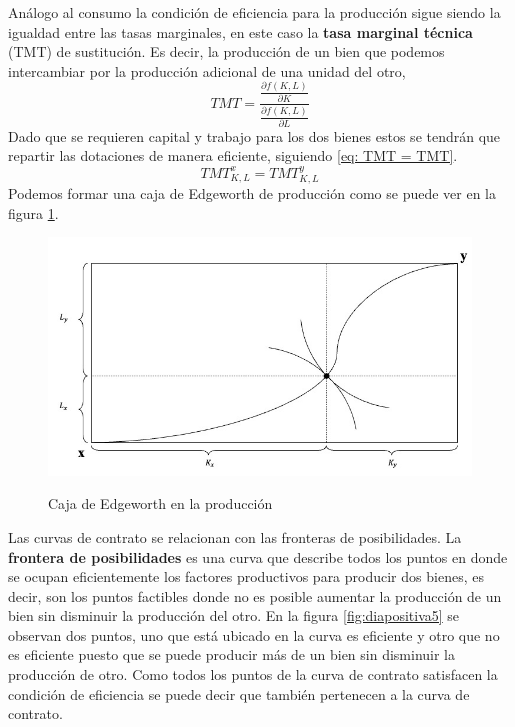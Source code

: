 Análogo al consumo la condición de eficiencia para la producción sigue siendo la igualdad entre las tasas marginales, en este caso la \textbf{tasa marginal técnica} (TMT) de sustitución. Es decir, la producción de un bien que podemos intercambiar por la producción adicional de una unidad del otro,
\begin{equation}
    TMT = \frac{ \frac{\partial f(K,L)}{\partial K} }{\frac{\partial f(K,L)}{\partial L} } \label{eq: TMT dfn}
\end{equation}
Dado que se requieren capital y trabajo para los dos bienes estos se tendrán que repartir las dotaciones de manera eficiente, siguiendo \ref{eq: TMT = TMT}.
\begin{equation}
    TMT^x_{K,L} = TMT^y_{K,L} \label{eq: TMT = TMT}
\end{equation}
Podemos formar una caja de Edgeworth de producción como se puede ver en la figura \ref{fig:diapositiva4}.
\begin{figure}[htbp]
    \centering
    \caption{Caja de Edgeworth en la producción}
    \includegraphics[width=\textwidth]{Figuras/EG Curva de contrato con produccion.jpeg}
    \label{fig:diapositiva4}
\end{figure}
Las curvas de contrato se relacionan con las fronteras de posibilidades. La \textbf{frontera de posibilidades} es una curva que describe todos los puntos en donde se ocupan eficientemente los factores productivos para producir dos bienes, es decir, son los puntos factibles donde no es posible aumentar la producción de un bien sin disminuir la producción del otro. En la figura \ref{fig:diapositiva5} se observan dos puntos, uno que está ubicado en la curva es eficiente y otro que no es eficiente puesto que se puede producir más de un bien sin disminuir la producción de otro. Como todos los puntos de la curva de contrato satisfacen la condición de eficiencia se puede decir que también pertenecen a la curva de contrato.
